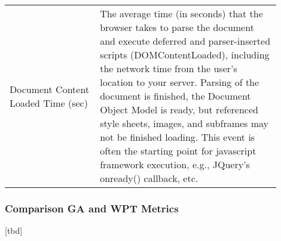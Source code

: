 \begin{center}
\begin{tabular}{ p{0.3\linewidth} | p{0.6\linewidth} }
	Document Content Loaded Time (sec) & The average time (in seconds) that the browser takes to parse the document and execute deferred and parser-inserted scripts (DOMContentLoaded), including the network time from the user's location to your server. Parsing of the document is finished, the Document Object Model is ready, but referenced style sheets, images, and subframes may not be finished loading. This event is often the starting point for javascript framework execution, e.g., JQuery's onready() callback, etc.  \\
	\end{tabular}
\end{center}











\subsubsection{Comparison GA and WPT Metrics}

[tbd]




